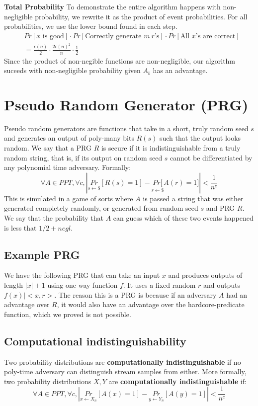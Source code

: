 \documentclass[11pt]{article}
\begin{document}
\textbf{Total Probability}
To demonstrate the entire algorithm happens with non-negligible probability, we rewrite it as the product of event probabilities. For all probabilities, we use the lower bound found in each step.
\begin{align*}
    &Pr[x \text{ is good}]\cdot Pr[\text{Correctly generate }m\ r\text{'s}] \cdot Pr[\text{All }x\text{'s are correct}]\\
    &= \frac{\epsilon(n)}{2} \cdot \frac{2\epsilon(n)^2}{n} \cdot \frac{1}{2}
\end{align*}
Since the product of non-negible functions are non-negligible, our algorithm suceeds with non-negligible probability given $A_b$ has an advantage.

\section{Pseudo Random Generator (PRG)}
Pseudo random generators are functions that take in a short, truly random seed $s$ and generates an output of poly-many bits $R(s)$ such that the output looks random. We say that a PRG $R$ is secure if it is indistinguishable from a truly random string, that is, if its output on random seed $s$ cannot be differentiated by any polynomial time adversary. Formally:
$$\forall A \in PPT, \forall c, |\underset{s \leftarrow \$}{Pr}[R(s) = 1] - \underset{r \leftarrow \$}{Pr[}A(r) = 1]| < \frac{1}{n^c}$$
This is simulated in a game of sorts where $A$ is passed a string that was either generated completely randomly, or generated from random seed $s$ and PRG $R$. We say that the probability that $A$ can guess which of these two events happened is less that $1/2 + negl$.
\subsection{Example PRG}
We have the following PRG that can take an input $x$ and produces outputs of length $|x| + 1$ using one way function $f$. It uses a fixed random $r$ and outputs $f(x) | <x,r>$. The reason this is a PRG is because if an adversary $A$ had an advantage over $R$, it would also have an advantage over the hardcore-predicate function, which we proved is not possible.

\subsection{Computational indistinguishability}
Two probability distributions are \textbf{computationally indistinguishable} if no poly-time adversary can distinguish stream samples from either. More formally, two probability distributions $X,Y$ are \textbf{computationally indistinguishable} if:
$$\forall A \in PPT, \forall c, |\underset{x\leftarrow X_n}{Pr}[A(x) = 1]-\underset{y\leftarrow Y_n}{Pr}[A(y) = 1]| < \frac{1}{n^c}$$
\end{document}
